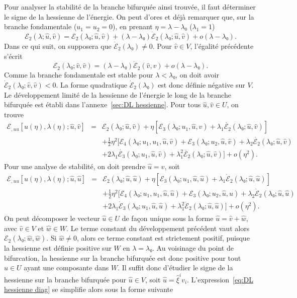 \documentclass{article}
\begin{document}
Pour analyser la stabilité de la branche bifurquée ainsi trouvée,
il faut déterminer le signe de la hessienne de l'énergie. On peut
d'ores et déjà remarquer que, sur la branche fondamentale ($u_1 = u_2
= 0$), en prenant $η = λ - λ₀$ ($λ_1 = 1$)
\begin{equation}
  ℰ_2 (λ ; \hat{u}, \hat{v}) =ℰ_2 (λ₀ ;
  \hat{u}, \hat{v}) + (λ - λ₀)  \dot{ℰ}_2 (λ₀ ;
  \hat{u}, \hat{v}) + o (λ - λ₀) .
\end{equation}
Dans ce qui suit, on supposera que $\dot{ℰ}_2 (λ₀) \neq 0$.
Pour $\hat{v}∈V$, l'égalité précédente s'écrit
\begin{equation}
  ℰ_2 (λ₀ ; \hat{v}, \hat{v}) = (λ - λ₀)
  \dot{ℰ}_2 (\hat{v}, \hat{v}) + o (λ - λ₀) .
\end{equation}
Comme la branche fondamentale est stable pour $λ < λ₀$, on doit
avoir $\dot{ℰ}_2 (λ₀ ; \hat{v}, \hat{v}) < 0$. La forme
quadratique $\dot{ℰ}_2 (λ₀)$ est donc définie
négative sur $V$. Le développement limité de la hessienne de
l'énergie le long de la branche bifurquée est établi dans
l'annexe~\ref{sec:DL hessienne}. Pour tous $\hat{u}, \hat{v}∈U$, on trouve
\begin{eqnarray}
  ℰ_{, u  u} [u (η), λ (η) ; \hat{u}, \hat{v}] &
  = & ℰ_2 (λ₀ ; \hat{u}, \hat{v}) + η [ℰ_3
  (λ₀ ; u_1, \hat{u}, \hat{v})   + λ_1
  \dot{ℰ_2} (λ₀ ; \hat{u}, \hat{v})] \nonumber\\
  &  &  + \tfrac{1}{2} η^2  [ℰ_4 (λ₀ ; u_1, u_1,
  \hat{u}, \hat{v})  +ℰ_3 (λ₀ ; u_2, \hat{u},
  \hat{v}) + λ_2  \dot{ℰ_2} (λ₀ ; \hat{u}, \hat{v})
  \nonumber\\
  &  &  + 2 λ_1  \dot{ℰ_3} (λ₀ ; u_1,
  \hat{u}, \hat{v}) + λ_1^2  \ddot{ℰ_2} (λ₀ ; \hat{u},
  \hat{v}) ] + o (η^2) .  \label{eq:DL hessienne}
\end{eqnarray}
Pour une analyse de stabilité, on doit prendre $\hat{u} = \hat{v}$, soit
\begin{eqnarray}
  ℰ_{, u  u} [u (η), λ (η) ; \hat{u}, \hat{u}] &
  = & ℰ_2 (λ₀ ; \hat{u}, \hat{u}) + η [ℰ_3
  (λ₀ ; u_1, \hat{u}, \hat{u}) + λ_1  \dot{ℰ}_2
  (λ₀ ; \hat{u}, \hat{u})] \nonumber\\
  &  & + \tfrac{1}{2} η^2  [ℰ_4 (λ₀ ; u_1, u_1, \hat{u},
  \hat{u}) +ℰ_3 (λ₀ ; u_2, \hat{u}, \hat{u}) + λ_2
  \dot{ℰ}_2 (λ₀ ; \hat{u}, \hat{u})  \nonumber\\
  &  & +  2 λ_1  \dot{ℰ}_3 (λ₀ ; u_1,
  \hat{u}, \hat{u}) + λ_1^2  \ddot{ℰ}_2 (λ₀ ; \hat{u},
  \hat{u})] + o (η^2) .  \label{eq:DL hessienne diag}
\end{eqnarray}
On peut décomposer le vecteur $\hat{u}∈U$ de fa{\c c}on unique sous la
forme $\hat{u} = \hat{v} + \hat{w}$, avec $\hat{v}∈V$ et $\hat{w}∈W$.
Le terme constant du développement précédent vaut alors
$ℰ_2 (λ₀ ; \hat{w}, \hat{w})$. Si $\hat{w} \neq 0$, alors ce
terme constant est strictement positif, puisque la hessienne est définie
positive sur $W$ en $λ = λ₀$. Au voisinage du point de
bifurcation, la hessienne sur la branche bifurquée est donc positive pour
tout $\hat{u}∈U$ ayant une composante dans $W$. Il suffit donc
d'étudier le signe de la hessienne sur la branche bifurquée pour
$\hat{u}∈V$, soit $\hat{u} = \hat{ξ}^i v_i$. L'expression~\eqref{eq:DL
hessienne diag} se simplifie alors sous la forme suivante
\end{document}
